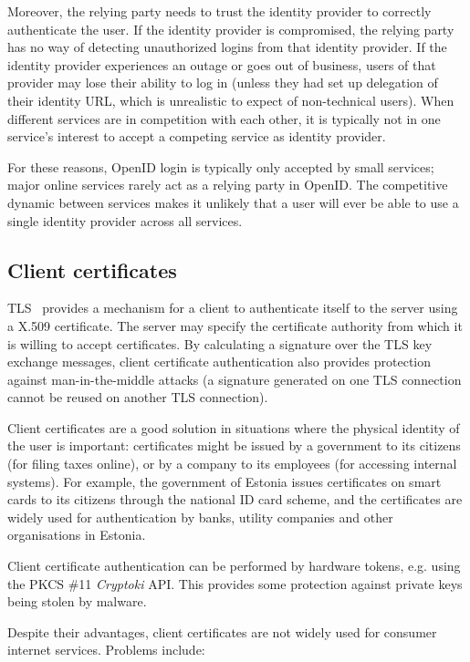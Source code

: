 Moreover, the relying party needs to trust the identity provider to correctly authenticate the user.
If the identity provider is compromised, the relying party has no way of detecting unauthorized
logins from that identity provider. If the identity provider experiences an outage or goes out of
business, users of that provider may lose their ability to log in (unless they had set up delegation
of their identity URL, which is unrealistic to expect of non-technical users). When different
services are in competition with each other, it is typically not in one service's interest to accept
a competing service as identity provider.

For these reasons, OpenID login is typically only accepted by small services; major online services
rarely act as a relying party in OpenID. The competitive dynamic between services makes it unlikely
that a user will ever be able to use a single identity provider across all services.

\subsection{Client certificates}

TLS~\cite{TLS} provides a mechanism for a client to authenticate itself to the server using a X.509
certificate. The server may specify the certificate authority from which it is willing to accept
certificates. By calculating a signature over the TLS key exchange messages, client certificate
authentication also provides protection against man-in-the-middle attacks (a signature generated on
one TLS connection cannot be reused on another TLS connection).

Client certificates are a good solution in situations where the physical identity of the user is
important: certificates might be issued by a government to its citizens (for filing taxes online),
or by a company to its employees (for accessing internal systems). For example, the government of
Estonia issues certificates on smart cards to its citizens through the national ID card scheme, and
the certificates are widely used for authentication by banks, utility companies and other
organisations in Estonia.~\cite{Parsovs14}

Client certificate authentication can be performed by hardware tokens, e.g. using the PKCS \#11
\emph{Cryptoki} API. This provides some protection against private keys being stolen by malware.

Despite their advantages, client certificates are not widely used for consumer internet services.
Problems include:

